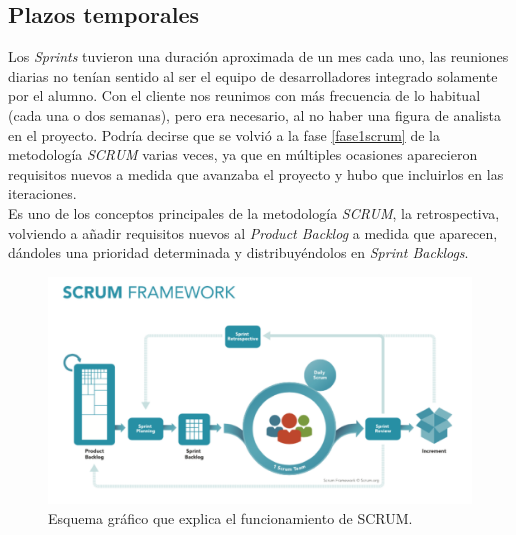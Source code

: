 \subsection*{Plazos temporales}
Los \textit{Sprints} tuvieron una duración aproximada de un mes cada uno, las reuniones diarias no tenían sentido al ser el equipo de desarrolladores integrado solamente por el alumno. Con el cliente nos reunimos con más frecuencia de lo habitual (cada una o dos semanas), pero era necesario, al no haber una figura de analista en el proyecto. Podría decirse que se volvió a la fase \ref{fase1scrum} de la metodología \textit{SCRUM} varias veces, ya que en múltiples ocasiones aparecieron requisitos nuevos a medida que avanzaba el proyecto y hubo que incluirlos en las iteraciones.\\
Es uno de los conceptos principales de la metodología \textit{SCRUM}, la retrospectiva, volviendo a añadir requisitos nuevos al \textit{Product Backlog} a medida que aparecen, dándoles una prioridad determinada y distribuyéndolos en \textit{Sprint Backlogs}.
\begin{figure}[H]
\begin{center}
\includegraphics[scale=0.3]{figures/scrum.png}
\caption{Esquema gráfico que explica el funcionamiento de SCRUM.}
\end{center}
\end{figure}
